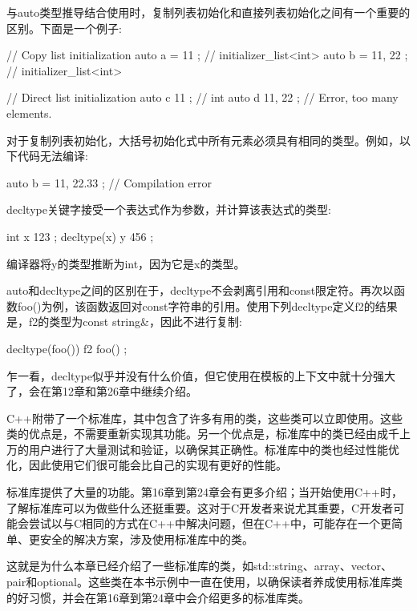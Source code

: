 与auto类型推导结合使用时，复制列表初始化和直接列表初始化之间有一个重要的区别。下面是一个例子:

\begin{cpp}
// Copy list initialization
auto a = { 11 }; // initializer_list<int>
auto b = { 11, 22 }; // initializer_list<int>

// Direct list initialization
auto c { 11 }; // int
auto d { 11, 22 }; // Error, too many elements.
\end{cpp}

对于复制列表初始化，大括号初始化式中所有元素必须具有相同的类型。例如，以下代码无法编译:

\begin{cpp}
auto b = { 11, 22.33 }; // Compilation error
\end{cpp}


decltype关键字接受一个表达式作为参数，并计算该表达式的类型:

\begin{cpp}
int x { 123 };
decltype(x) y { 456 };
\end{cpp}

编译器将y的类型推断为int，因为它是x的类型。

auto和decltype之间的区别在于，decltype不会剥离引用和const限定符。再次以函数foo()为例，该函数返回对const字符串的引用。使用下列decltype定义f2的结果是，f2的类型为const string\&，因此不进行复制:

\begin{cpp}
decltype(foo()) f2 { foo() };
\end{cpp}

乍一看，decltype似乎并没有什么价值，但它使用在模板的上下文中就十分强大了，会在第12章和第26章中继续介绍。


C++附带了一个标准库，其中包含了许多有用的类，这些类可以立即使用。这些类的优点是，不需要重新实现其功能。另一个优点是，标准库中的类已经由成千上万的用户进行了大量测试和验证，以确保其正确性。标准库中的类也经过性能优化，因此使用它们很可能会比自己的实现有更好的性能。

标准库提供了大量的功能。第16章到第24章会有更多介绍；当开始使用C++时，了解标准库可以为做些什么还挺重要。这对于C开发者来说尤其重要，C开发者可能会尝试以与C相同的方式在C++中解决问题，但在C++中，可能存在一个更简单、更安全的解决方案，涉及使用标准库中的类。

这就是为什么本章已经介绍了一些标准库的类，如std::string、array、vector、pair和optional。这些类在本书示例中一直在使用，以确保读者养成使用标准库类的好习惯，并会在第16章到第24章中会介绍更多的标准库类。







